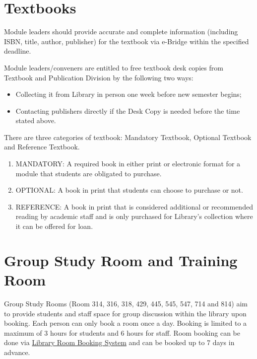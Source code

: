 \documentclass[
]{book}
\providecommand{\tightlist}{%
  \setlength{\itemsep}{0pt}\setlength{\parskip}{0pt}}
\begin{document}
\hypertarget{textbooks}{%
\section{Textbooks}\label{textbooks}}

Module leaders should provide accurate and complete information (including ISBN, title, author, publisher) for the textbook via e-Bridge within the specified deadline.

Module leaders/conveners are entitled to free textbook desk copies from Textbook and Publication Division by the following two ways:

\begin{itemize}
\tightlist
\item
  Collecting it from Library in person one week before new semester begins;
\item
  Contacting publishers directly if the Desk Copy is needed before the time stated above.
\end{itemize}

There are three categories of textbook: Mandatory Textbook, Optional Textbook and Reference Textbook.

\begin{enumerate}
\def\labelenumi{\arabic{enumi}.}
\tightlist
\item
  MANDATORY: A required book in either print or electronic format for a module that students are obligated to purchase.
\item
  OPTIONAL: A book in print that students can choose to purchase or not.
\item
  REFERENCE: A book in print that is considered additional or recommended reading by academic staff and is only purchased for Library's collection where it can be offered for loan.
\end{enumerate}

\hypertarget{group-study-room-and-training-room}{%
\section{Group Study Room and Training Room}\label{group-study-room-and-training-room}}

Group Study Rooms (Room 314, 316, 318, 429, 445, 545, 547, 714 and 814) aim to provide students and staff space for group discussion within the library upon booking. Each person can only book a room once a day. Booking is limited to a maximum of 3 hours for students and 6 hours for staff. Room booking can be done via \href{http://bookings.lib.xjtlu.edu.cn}{Library Room Booking System} and can be booked up to 7 days in advance.
\end{document}
